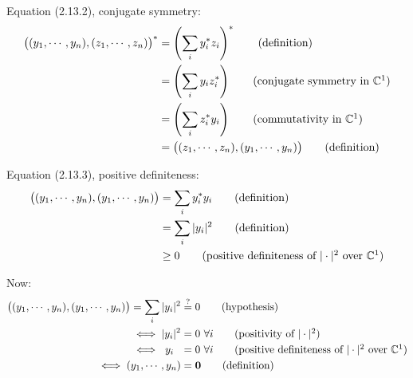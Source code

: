 Equation (2.13.2), conjugate symmetry:
\begin{align}
	\bigl((y_1, \cdots, y_n), (z_1, \cdots, z_n)\bigr)^*
	&= \left(\sum_i y_i^* z_i \right)^* \tag{definition}\\
	&= \left(\sum_i y_i  z_i^* \right) \tag{conjugate symmetry in $\mathbb{C}^1$}\\
	&= \left(\sum_i z_i^* y_i \right) \tag{commutativity in $\mathbb{C}^1$}\\
	&= \bigl((z_1, \cdots, z_n) , (y_1, \cdots, y_n)\bigr) \tag{definition}
\end{align}


Equation (2.13.3), positive definiteness:
\begin{align*}
	\bigl((y_1, \cdots, y_n), (y_1, \cdots, y_n)\bigr)
	&= \sum_i y_i^* y_i \tag{definition}\\
	&= \sum_i |y_i|^2 \tag{definition} \\
	&\geq 0 \tag{positive definiteness of $|\cdot|^2$ over $\mathbb{C}^1$}
\end{align*}

Now:
\begin{align*}
	\bigl((y_1, \cdots, y_n), (y_1, \cdots, y_n)\bigr) = \sum_i |y_i|^2 &\stackrel{?}{=} 0 \tag{hypothesis}\\ \iff |y_i|^2 &= 0\  \forall i \tag{positivity of $|\cdot|^2$}\\ \iff \ y_i\ \  &= 0\  \forall i \tag{positive definiteness of $|\cdot|^2$ over $\mathbb{C}^1$}\\ \iff (y_1, \cdots, y_n) &=  \textbf{0} \tag{definition}
\end{align*}

%
%

